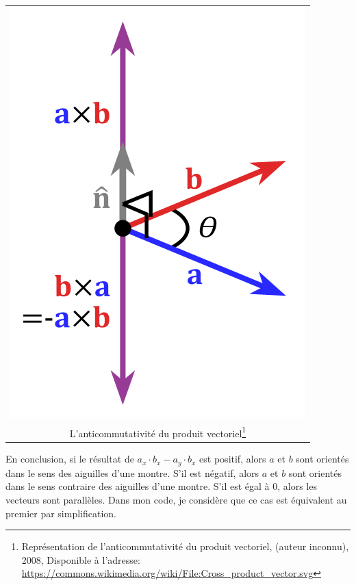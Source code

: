 \documentclass[11pt,french,a4paper,]{article}
\begin{document}
\begin{longtable}[]{@{}c@{}}
\toprule
\endhead
\includegraphics[width=\textwidth,height=0.25\textheight]{../img/Drawings/anticommutativite.png}\tabularnewline
L'anticommutativité du produit vectoriel\footnote{Représentation de
  l'anticommutativité du produit vectoriel, (auteur inconnu), 2008,
  Disponible à l'adresse:
  \url{https://commons.wikimedia.org/wiki/File:Cross_product_vector.svg}}\tabularnewline
\bottomrule
\end{longtable}

En conclusion, si le résultat de \(a_x \cdot b_x − a_y \cdot b_x\) est
positif, alors \(a\) et \(b\) sont orientés dans le sens des aiguilles
d'une montre. S'il est négatif, alors \(a\) et \(b\) sont orientés dans
le sens contraire des aiguilles d'une montre. S'il est égal à 0, alors
les vecteurs sont parallèles. Dans mon code, je considère que ce cas est
équivalent au premier par simplification.
\end{document}
